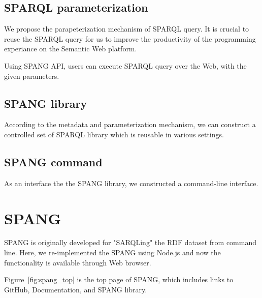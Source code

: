 \documentclass[runningheads]{llncs}
\begin{document}
\subsection{SPARQL parameterization}

We propose the parapeterization mechanism of SPARQL query. It is crucial to reuse the SPARQL query for us to improve the productivity of the programming experiance on the Semantic Web platform.

Using SPANG API, users can execute SPARQL query over the Web, with the given parameters.

\subsection{SPANG library}

According to the metadata and parameterization mechanism, we can construct a controlled set of SPARQL library which is reusable in various settings.

\subsection{SPANG command}

As an interface the the SPANG library, we constructed a command-line interface.


\section{SPANG}
SPANG is originally developed for "SARQLing" the RDF dataset from command line. Here, we re-implemented the SPANG using Node.js and now the functionality is available through Web browser. 

Figure~\ref{fig:spang_top} is the top page of SPANG, which includes links to GitHub, Documentation, and SPANG library.
\end{document}
